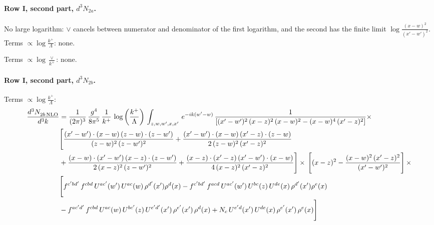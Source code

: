 \documentclass[10pt]{article}
\numberwithin{equation}{section}
\begin{document}
\paragraph{Row I, second part, $d^3N_{2a}$.}
No large logarithm: $\vee$ cancels between numerator and denominator of the first logarithm, and the second has the finite limit $\log\frac{(x-w)^2}{(x'-w')^2}$.
\noindent Terms $\propto\log\frac{k^+}{\Lambda}$: none.

\noindent Terms $\propto\log\frac{\vee}{k^+}$: none.

\paragraph{Row I, second part, $d^3N_{2b}$.}
\noindent Terms $\propto\log\frac{k^+}{\Lambda}$:
\begin{align}
    \frac{d^{3}N_{2b\,\rm NLO}^{\rm}}{d^{3}k}  & =  \frac{1}{(2\pi)^{3}}\, \frac{g^{4}}{8\pi^{5}}\,\frac{1}{k^{+}}\,\log{\left(\frac{k^{+}}{\Lambda}\right)}\,\int_{z,w,w^{\prime},x,x'}\, e^{-ik(w^{\prime}-w)}\, \frac{1}{\left[(x'-w')^{2}\,(x-z)^{2}\,(x-w)^{2} - (x-w)^{4}\, (x'-z)^{2}\right]} \times\notag \\ & \Bigg[\frac{(x'-w')\cdot (x-w)\, (z-w)\cdot (z-w')}{(z-w)^{2}\, (z-w')^{2}}+\frac{(x'-w')\cdot (x-w)\, (x'-z)\cdot (z-w)}{2\, (z-w)^{2}\, (x'-z)^{2}}\notag \\ & +\frac{(x-w)\cdot (x'-w')\, (x-z)\cdot (z-w')}{2\, (x-z)^{2}\, (z-w')^{2}}+\frac{(x-z)\cdot (x'-z)\, (x'-w')\cdot (x-w)}{4\, (x-z)^{2}\, (x'-z)^{2}}\Bigg] \times\,\Bigg[(x-z)^{2} - \frac{(x-w)^{2}\, (x'-z)^{2}}{(x'-w')^{2}}\Bigg]\,\times \notag \\ & \Bigg[f^{c'bd'}\,f^{cbd}\, U^{ac'}(w')\,U^{ac}(w)\,\rho^{d'}(x')\rho^{d}(x)- f^{c'bd'}\,f^{acd}\,U^{ac'}(w')\,U^{bc}(z)\,U^{de}(x)\,\rho^{d'}(x')\rho^{e}(x) \notag \\ & -f^{ac'd'}\,f^{cbd}\,U^{ac}(w)\,U^{bc'}(z)\,U^{e'd'}(x')\,\rho^{e'}(x')\,\rho^{d}(x) +N_{c}\,U^{e'd}(x')\,U^{de}(x)\,\rho^{e'}(x')\,\rho^{e}(x)\Bigg] \label{eq:J:G2I2b}
\end{align}
\end{document}
